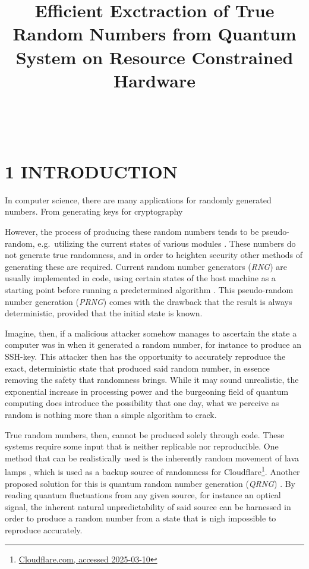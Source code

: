 \documentclass{sigchi}
\def\plaintitle{Efficient Exctraction of True Random Numbers from Quantum System on Resource Constrained Hardware}
\begin{document}
\title{\plaintitle}

\author{%
	\\
	\\
}

\maketitle


\section{1 INTRODUCTION}\label{introduction}

In computer science, there are many applications for randomly generated numbers. From generating keys for cryptography

However, the process of producing these random numbers tends to be pseudo-random, e.g.~utilizing the current states of various modules \cite{randomness}. These numbers do not generate true randomness, and in order to heighten security other methods of generating these are required. Current random number generators (\emph{RNG}) are usually implemented in code, using certain states of the host machine as a starting point before running a predetermined algorithm \cite{randomness}. This pseudo-random number generation (\emph{PRNG}) comes with the drawback that the result is always deterministic, provided that the initial state is known.

Imagine, then, if a malicious attacker somehow manages to ascertain the state a computer was in when it generated a random number, for instance to produce an SSH-key. This attacker then has the opportunity to accurately reproduce the exact, deterministic state that produced said random number, in essence removing the safety that randomness brings. While it may sound unrealistic, the exponential increase in processing power and the burgeoning field of quantum computing does introduce the possibility that one day, what we perceive as random is nothing more than a simple algorithm to crack.

True random numbers, then, cannot be produced solely through code. These systems require some input that is neither replicable nor reproducible. One method that can be realistically used is the inherently random movement of lava lamps \cite{lavarand}, which is used as a backup source of randomness for Cloudflare\footnote{\href{https://blog.cloudflare.com/randomness-101-lavarand-in-production/}{Cloudflare.com, accessed 2025-03-10}}. Another proposed solution for this is quantum random number generation (\emph{QRNG}) \cite{QRNG}. By reading quantum fluctuations from any given source, for instance an optical signal, the inherent natural unpredictability of said source can be harnessed in order to produce a random number from a state that is nigh impossible to reproduce accurately.
\end{document}
